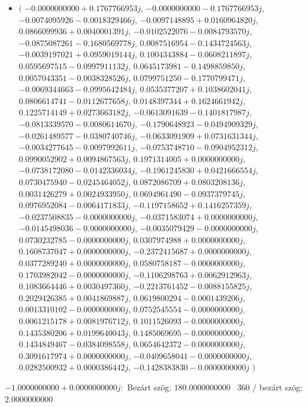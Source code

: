 \documentclass[14pt,a4paper]{article}
\begin{document}
\begin{itemize}
\item
$\big($
$-0.0000000000+0.1767766953j$, $-0.0000000000-0.1767766953j$, $-0.0074095926-0.0018329466j$, $-0.0097148895+0.0160964820j$, $0.0866099936+0.0040001391j$, $-0.0102522076-0.0084793570j$, $-0.0875087261-0.1680569778j$, $0.0087516954-0.1434724563j$, $-0.0039197021+0.0959019144j$, $0.1004343884-0.0608211897j$, $0.0595697515-0.0997911132j$, $0.0645173981-0.1498859850j$, $0.0057043351-0.0038328526j$, $0.0799751250-0.1770799471j$, $-0.0069344663-0.0995642484j$, $0.0535377207+0.1038602041j$, $0.0806614741-0.0112677658j$, $0.0148397344+0.1624661942j$, $0.1225714149+0.0273663182j$, $-0.0613091639-0.1401817987j$, $-0.0813339570-0.0080614670j$, $-0.1790648923-0.0494909329j$, $-0.0261489577-0.0380740746j$, $-0.0633091909+0.0731631344j$, $-0.0034277645-0.0097992611j$, $-0.0753748710-0.0904952312j$, $0.0990052902+0.0094867563j$, $0.1971314005+0.0000000000j$, $-0.0738172080-0.0142336034j$, $-0.1961245830+0.0421666554j$, $0.0730475940-0.0245464052j$, $0.0872086709+0.0803208136j$, $0.0031426279+0.0024933950j$, $0.0694961490-0.0937379745j$, $0.0976952084-0.0064171833j$, $-0.1197158652+0.1416257359j$, $-0.0237508835-0.0000000000j$, $-0.0371583074+0.0000000000j$, $-0.0145498036-0.0000000000j$, $-0.0035079429-0.0000000000j$, $0.0730232785-0.0000000000j$, $0.0307974988+0.0000000000j$, $0.1608737047+0.0000000000j$, $-0.2372415687+0.0000000000j$, $0.0377289240+0.0000000000j$, $0.0580758187-0.0000000000j$, $0.1703982042-0.0000000000j$, $-0.1106298763+0.0062912963j$, $0.1083664446+0.0030497360j$, $-0.2213761452-0.0088155825j$, $0.2029426385+0.0041869887j$, $0.0619800294-0.0001439206j$, $0.0013310102-0.0000000000j$, $0.0752545554-0.0000000000j$, $0.0061215178+0.0081976712j$, $0.1011526093-0.0000000000j$, $0.1435380206+0.0199640043j$, $0.1485069695-0.0000000000j$, $0.1434849467-0.0384098558j$, $0.0654642372-0.0000000000j$, $0.3091617974+0.0000000000j$, $-0.0409658041-0.0000000000j$, $0.0282500932+0.0000386442j$, $-0.1428383830-0.0000000000j$
$\big)$
\end{itemize}
$-1.0000000000+0.0000000000j$:\
Bezárt szög: $180.0000000000$ \
360 / bezárt szög: $2.0000000000$\
\end{document}
